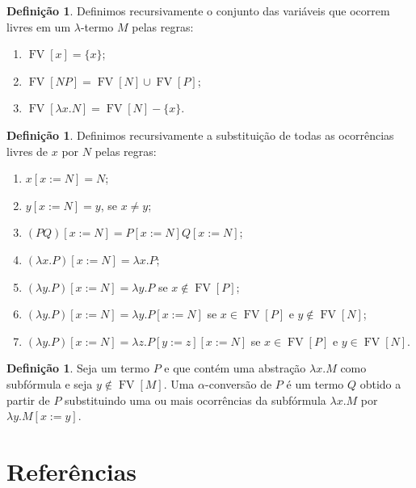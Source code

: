 \documentclass[12pt]{article}
\theoremstyle{definition}
\newtheorem{definition}[theorem]{Definição}
\DeclareMathOperator{\FV}{\mathrm{FV}}
\begin{document}
\begin{definition}
  Definimos recursivamente o conjunto das variáveis que ocorrem livres em um $\lambda$-termo $M$ pelas regras:
  \begin{enumerate}
  \item $\FV[x] = \{x\}$;
  \item $\FV[NP] = \FV[N] \cup \FV[P]$;
  \item $\FV[\lambda x.N] = \FV[N] - \{x\}$.
  \end{enumerate}
\end{definition}
\vspace{1cm}

\begin{definition}
  Definimos recursivamente a substituição de todas as ocorrências livres de $x$ por $N$ pelas regras:
  \begin{enumerate}
  \item $x[x := N] = N$;
  \item $y[x := N] = y$, se $x \neq y$;
  \item $(PQ)[x := N] = P[x := N] Q[x := N]$;
  \item $(\lambda x.P)[x := N] = \lambda x.P$;
  \item $(\lambda y.P)[x := N] = \lambda y.P$ se $x \not\in \FV[P]$;
  \item $(\lambda y.P)[x := N] = \lambda y.P[x := N]$ se $x \in \FV[P]$ e $y \not\in \FV[N]$;
  \item $(\lambda y.P)[x := N] = \lambda z.P[y := z][x := N]$ se $x \in \FV[P]$ e $y \in \FV[N]$.  
  \end{enumerate}
\end{definition}
\vspace{1cm}

\begin{definition}
  Seja um termo $P$ e que contém uma abstração $\lambda x.M$ como subfórmula e seja $y \not\in \FV[M]$. Uma $\alpha$-conversão de $P$ é um termo $Q$ obtido a partir de $P$ substituindo uma ou mais ocorrências da subfórmula $\lambda x.M$ por $\lambda y.M[x := y]$. 
\end{definition}

\section{Referências}

\nocite{*}


\end{document}
